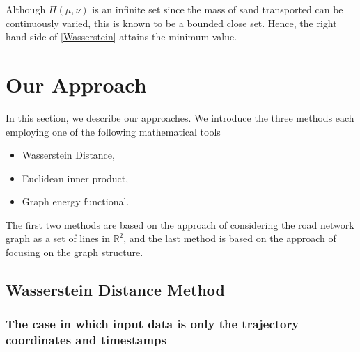 \documentclass{article}
\numberwithin{equation}{section}
\theoremstyle{definition}
\newcommand{\R}{\mathbb{R}}
\begin{document}
Although $\Pi(\mu,\nu)$ is an infinite set since the mass of sand transported can be continuously varied, this is known to be a bounded close  set.
Hence, the right hand side of \eqref{Wasserstein} attains the minimum value.



\section{Our Approach}

In this section, we describe our approaches.
We introduce the three methods each employing one of the following mathematical tools
\begin{itemize}
    \item Wasserstein Distance,
    \item Euclidean inner product,
    \item Graph energy functional.
\end{itemize}
The first two methods are based on the approach of considering the road network graph as a set of lines in $\R^2$, and the last method is based on the approach of focusing on the graph structure.

\subsection{Wasserstein Distance Method}

\subsubsection*{The case in which input data is only the trajectory coordinates and timestamps} %
\end{document}
